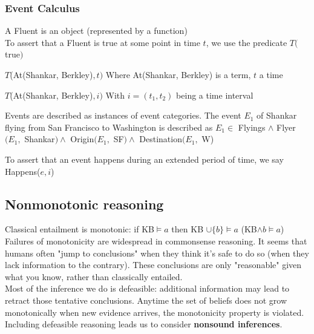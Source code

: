 \documentclass[10pt]{report}
\begin{document}
\subsubsection{Event Calculus}
\begin{list}{}{}
	\item A Fluent is an object (represented by a function)\\
	To assert that a Fluent is true at some point in time $t$, we use the predicate $T($true$)$
	\begin{list}{}{}
		\item $T$(At(Shankar, Berkley)$, t)$
		Where  At(Shankar, Berkley) is a term, $t$ a time
		\item $T$(At(Shankar, Berkley)$, i)$
		With $i = (t_1, t_2)$ being a time interval
	\end{list}
	\item Events are described as instances of event categories. The event $E_1$ of Shankar flying from San Francisco to Washington is described as $E_1\in$ Flyings $\wedge$ Flyer$(E_1,$ Shankar$)\wedge$ Origin$(E_1,$ SF$)\wedge$ Destination$(E_1,$ W)
	\item To assert that an event happens during an extended period of time, we say Happens($e,i$)
\end{list}
\subsection{Nonmonotonic reasoning}
Classical entailment is monotonic: if KB$\vDash a$ then KB $\cup \{b\}\vDash a$ (KB$\wedge b\vDash a$)\\
Failures of monotonicity are widespread in commonsense reasoning. It seems that humans often "jump to conclusions" when they think it's safe to do so (when they lack information to the contrary). These conclusions are only "reasonable" given what you know, rather than classically entailed.\\
Most of the inference we do is defeasible: additional information may lead to retract those tentative conclusions. Anytime the set of beliefs does not grow monotonically when new evidence arrives, the monotonicity property is violated. Including defeasible reasoning leads us to consider \textbf{nonsound inferences}.
\end{document}
